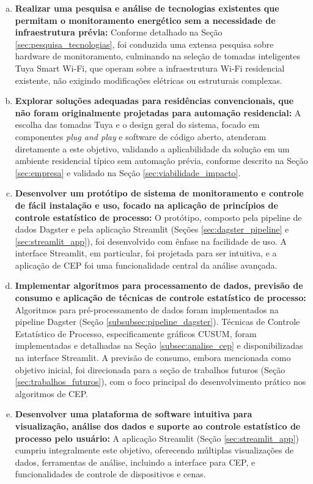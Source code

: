 \begin{enumerate}[a)]
    \item \textbf{Realizar uma pesquisa e análise de tecnologias existentes que permitam o monitoramento energético sem a necessidade de infraestrutura prévia:} Conforme detalhado na Seção \ref{sec:pesquisa_tecnologias}, foi conduzida uma extensa pesquisa sobre hardware de monitoramento, culminando na seleção de tomadas inteligentes Tuya Smart Wi-Fi, que operam sobre a infraestrutura Wi-Fi residencial existente, não exigindo modificações elétricas ou estruturais complexas.

    \item \textbf{Explorar soluções adequadas para residências convencionais, que não foram originalmente projetadas para automação residencial:} A escolha das tomadas Tuya e o design geral do sistema, focado em componentes \textit{plug and play} e software de código aberto, atenderam diretamente a este objetivo, validando a aplicabilidade da solução em um ambiente residencial típico sem automação prévia, conforme descrito na Seção \ref{sec:empresa} e validado na Seção \ref{sec:viabilidade_impacto}.

    \item \textbf{Desenvolver um protótipo de sistema de monitoramento e controle de fácil instalação e uso, focado na aplicação de princípios de controle estatístico de processo:} O protótipo, composto pela pipeline de dados Dagster e pela aplicação Streamlit (Seções \ref{sec:dagster_pipeline} e \ref{sec:streamlit_app}), foi desenvolvido com ênfase na facilidade de uso. A interface Streamlit, em particular, foi projetada para ser intuitiva, e a aplicação de CEP foi uma funcionalidade central da análise avançada.

    \item \textbf{Implementar algoritmos para processamento de dados, previsão de consumo e aplicação de técnicas de controle estatístico de processo:} Algoritmos para pré-processamento de dados foram implementados na pipeline Dagster (Seção \ref{subsubsec:pipeline_dagster}). Técnicas de Controle Estatístico de Processo, especificamente gráficos CUSUM, foram implementadas e detalhadas na Seção \ref{subsec:analise_cep} e disponibilizadas na interface Streamlit. A previsão de consumo, embora mencionada como objetivo inicial, foi direcionada para a seção de trabalhos futuros (Seção \ref{sec:trabalhos_futuros}), com o foco principal do desenvolvimento prático nos algoritmos de CEP.

    \item \textbf{Desenvolver uma plataforma de software intuitiva para visualização, análise dos dados e suporte ao controle estatístico de processo pelo usuário:} A aplicação Streamlit (Seção \ref{sec:streamlit_app}) cumpriu integralmente este objetivo, oferecendo múltiplas visualizações de dados, ferramentas de análise, incluindo a interface para CEP, e funcionalidades de controle de dispositivos e cenas.


\end{enumerate}
